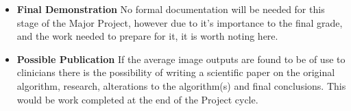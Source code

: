 \documentclass[11pt,fleqn,twoside]{article}
\begin{document}
\begin{itemize}
\item \textbf{Final Demonstration} No formal documentation will be needed for this stage of the Major Project, however due to it's importance to the final grade, and the work needed to prepare for it, it is worth noting here.

\item \textbf{Possible Publication} If the average image outputs are found to be of use to clinicians there is the possibility of writing a scientific paper on the original algorithm, research, alterations to the algorithm(s) and final conclusions. This would be work completed at the end of the Project cycle.

\end{itemize}

\nocite{*} %

\newpage
{}

%
%

\renewcommand{\refname}{Annotated Bibliography}  %
\end{document}
